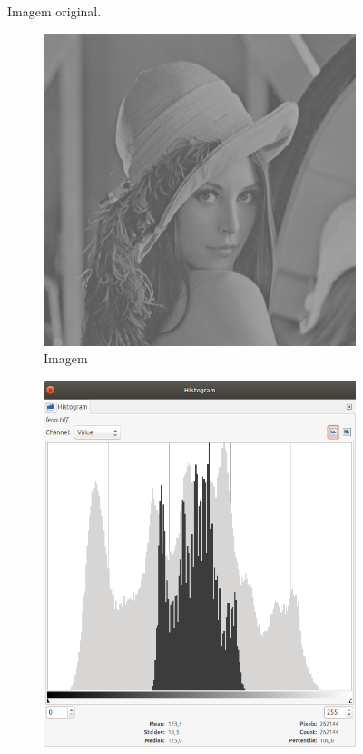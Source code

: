 \begin{figure}[!h]
    \caption{\label{fig:lena_gray} Imagem original.}
\end{figure}

\begin{figure}[!h]
    \def\figw{0.45\textwidth}
    \centering
        \begin{subfigure}{\figw}
            \centering
            \includegraphics[scale=\scalei]{images/03/lena_gray2.png}
            \caption{\label{fig:lena_gray2:hist} Imagem}
        \end{subfigure}
        \begin{subfigure}{\figw}
            \centering
            \includegraphics[scale=\scaleh]{images/03/hist_lena_gray2.png}

\end{subfigure}
\end{figure}
